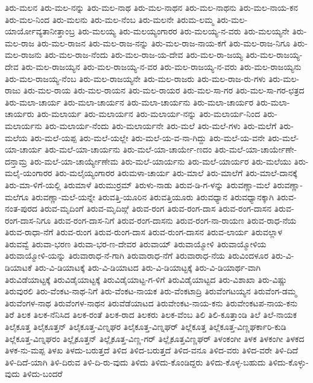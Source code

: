 ತಿರು-ಮಲನ
ತಿರು-ಮಲ-ನನ್ನು
ತಿರು-ಮಲ-ನಾಥ
ತಿರು-ಮಲ-ನಾಥನ
ತಿರು-ಮಲ-ನಾಥನು
ತಿರು-ಮಲ-ನಾಯ-ಕನ
ತಿರು-ಮಲ-ನಿಂದ
ತಿರು-ಮಲನು
ತಿರು-ಮಲ-ನೆಂಬ
ತಿರು-ಮಲನೇ
ತಿರುಮ-ಲಮ್ಮ
ತಿರು-ಮಲ-ಯಾರ್ಯೋವ್ಯತಾನೀತ್ತಾಂಬ್ರ
ತಿರು-ಮಲಯ್ಯ
ತಿರು-ಮಲಯ್ಯಂಗಾರರ
ತಿರು-ಮಲಯ್ಯ-ನ-ವರು
ತಿರು-ಮಲಯ್ಯನೇ
ತಿರು-ಮಲ-ರಾಜ
ತಿರು-ಮಲ-ರಾಜನ
ತಿರು-ಮಲ-ರಾಜ-ನನ್ನು
ತಿರು-ಮಲ-ರಾಜ-ನಾಯ-ಕಗೆ
ತಿರು-ಮಲ-ರಾಜ-ನಿಗೂ
ತಿರು-ಮಲ-ರಾಜನು
ತಿರು-ಮಲ-ರಾಜ-ನೆಂದು
ತಿರು-ಮಲ-ರಾಜ-ಯ-ದೇವ
ತಿರು-ಮಲ-ರಾ-ಜಯ್ಯ
ತಿರು-ಮಲ-ರಾಜಯ್ಯ-ದೇವ
ತಿರು-ಮಲ-ರಾಜಯ್ಯನ
ತಿರು-ಮಲ-ರಾಜಯ್ಯ-ನ-ವರ
ತಿರು-ಮಲ-ರಾಜಯ್ಯ-ನ-ವರು
ತಿರು-ಮಲ-ರಾಜಯ್ಯನು
ತಿರು-ಮಲ-ರಾಜಯ್ಯ-ನೆಂಬ
ತಿರು-ಮಲ-ರಾಜಯ್ಯನೇ
ತಿರು-ಮಲ-ರಾಜರು
ತಿರು-ಮಲ-ರಾಜ-ರು-ಗಳು
ತಿರು-ಮಲ-ರಾಜು
ತಿರು-ಮಲ-ರಾಯ
ತಿರು-ಮಲ-ರಾಯನ
ತಿರು-ಮಲ-ರಾಯರ
ತಿರು-ಮಲ-ಸಾ-ಗರ
ತಿರು-ಮಲ-ಸಾ-ಗರ-ಛತ್ರದ
ತಿರು-ಮಲಾ-ಚಾರ್ಯ
ತಿರು-ಮಲಾ-ಚಾರ್ಯನ
ತಿರು-ಮಲಾ-ಚಾರ್ಯನು
ತಿರು-ಮಲಾ-ಚಾರ್ಯರ
ತಿರು-ಮಲಾ-ಚಾರ್ಯರು
ತಿರು-ಮಲಾರ್ಯ
ತಿರು-ಮಲಾರ್ಯನ
ತಿರು-ಮಲಾರ್ಯ-ನನ್ನು
ತಿರು-ಮಲಾರ್ಯ-ನಿಂದ
ತಿರು-ಮಲಾರ್ಯನು
ತಿರು-ಮಲಾರ್ಯ-ನೆಂದು
ತಿರು-ಮಲಾರ್ಯನೇ
ತಿರು-ಮಲೆ
ತಿರು-ಮಲೆ-ಗಳು
ತಿರು-ಮಲೆಗೆ
ತಿರು-ಮಲೆಯ
ತಿರು-ಮಲೆ-ಯಪ್ಪ
ತಿರು-ಮಲೆ-ಯಲ್ಲೇ
ತಿರು-ಮಲೆ-ಯ-ವ-ನಾ-ಗಿದ್ದು
ತಿರು-ಮಲೆ-ಯ-ವನೇ
ತಿರು-ಮಲೆ-ಯಾ-ಚಾರ್ಯ
ತಿರು-ಮಲೆ-ಯಾ-ಚಾರ್ಯನು
ತಿರು-ಮಲೆ-ಯಾ-ಚಾರ್ಯೇ-ಣದಂ
ತಿರು-ಮಲೆ-ಯಾ-ಚಾರ್ಯೇಣೇ-ದನ್ತಾಮ್ರ
ತಿರು-ಮಲೆ-ಯಾ-ಚಾರ್ಯ್ಯೇಣೇಮ
ತಿರು-ಮಲೆ-ಯಾರ್ಯನು
ತಿರು-ಮಲೆ-ಯಾರ್ಯರ
ತಿರು-ಮಲೆಯು
ತಿರು-ಮಲೈ-ಯಂಗಾರರ
ತಿರು-ಮಲೈಯ್ಯಂಗಾರರ
ತಿರುಮಳಾ-ಚಾರ್ಯ
ತಿರು-ಮಾಲೆ
ತಿರು-ಮಾಲೆಗೆ
ತಿರು-ಮಾಲೆ-ದಾನಕ್ಕೆ
ತಿರು-ಮಾ-ಳಿಗೆ-ಯಲ್ಲಿ
ತಿರುಮಾಳೆ
ತಿರುಮುರ್ರಮ್
ತಿರುಳು-ನಾಡು
ತಿರುವ-ಡಿ-ಗ-ಳನ್ನು
ತಿರುವಣ್ಣಾ-ಮಲೆ
ತಿರುವಣ್ಣಾ-ಮಲೆಗೂ
ತಿರುವಣ್ಣಾ-ಮಲೆ-ಯನ್ನೇ
ತಿರುವತ್ತಿ-ಯೂರಿನ
ತಿರುವತ್ತಿಯೂರು
ತಿರುವಧ್ಯಾನ
ತಿರುವಧ್ಯಾನಕ್ಕಾಗಿ
ತಿರುವ-ನಂತ-ಪುರದ
ತಿರುವ-ಮೃದಿಂಗೆ
ತಿರುವ-ಮೃದಿಙ್ಗೆ
ತಿರುವ-ರಂಗ
ತಿರುವ-ರಂಗ-ದಾಸ
ತಿರುವ-ರಂಗ-ದಾಸನ
ತಿರುವ-ರಂಗ-ದಾಸ-ನಿಗೂ
ತಿರುವ-ರಂಗ-ದಾಸ-ನಿಗೆ
ತಿರುವ-ರಂಗ-ದಾಸನು
ತಿರುವ-ರಂಗ-ನಾ-ರಾಯಣ
ತಿರುವ-ರಾಧ-ನೆಯ
ತಿರುವ-ರಾಧಾ-ನೆಗೆ
ತಿರುವ-ರುಂಗ
ತಿರುವ-ರುಂಗ-ದಾಸ
ತಿರುವ-ರುಂಗ-ದಾಸನ
ತಿರುವ-ಲಾರ್ಯ
ತಿರುವಲ್ಲಾಳ
ತಿರುವವ್ವೆ
ತಿರುವಾ-ಭರಣ
ತಿರುವಾ-ಭರ-ಣ-ದೇವರ
ತಿರುವಾಯ್
ತಿರುವಾಯ್ಮೋಳಿ
ತಿರುವಾಯ್ಮೋಳಿಯ
ತಿರುವಾಯ್ಮೋಳಿ-ಯನ್ನು
ತಿರುವಾರಾಧ-ನೆ-ಗಾಗಿ
ತಿರುವಾರಾಧ-ನೆಗೆ
ತಿರುವಾರಾಧ-ನೆಯ
ತಿರುವಿಂದಳೂರ
ತಿರು-ವಿ-ಡಿಯಾಟಕೆ
ತಿರು-ವಿ-ಡಿಯಾಟಕ್ಕೆ
ತಿರು-ವಿ-ಡಿಯಾಟದ
ತಿರು-ವಿ-ಡಿಯಾಟ್ಟಕ್ಕೆ
ತಿರು-ವಿ-ಡಿಯಾರ್ಥ-ವಾಗಿ
ತಿರುವಿಡೆಯಾಟ್ಟಕ್ಕೆ
ತಿರುವಿಡೈಯಾಟ್ಟಕ್ಕೆ
ತಿರುವಿಡೈಯಾಟ್ಟ-ಗ-ಳಿಗೆ
ತಿರುವಿಡೈಯಾಟ್ಟದ
ತಿರು-ವಿಶಾಖಾ
ತಿರು-ವಿಷ್ಣು
ತಿರುವುರಲಿ
ತಿರು-ವೆಂಕಟ-ನಾಥ-ನಿಗೆ
ತಿರು-ವೆಂಕಟ-ನಾಯಕ
ತಿರು-ವೆಂಕಟಾದ್ರಿ
ತಿರುವೆಂಗಟಯ್ಯನ
ತಿರುವೆಂಗ-ಡಮ್ಮ
ತಿರುವೆಂಗಳ-ನಾಥ
ತಿರುವೆಂಗಳ-ನಾಥನ
ತಿರುವೆಡೆಯಾಟದ
ತಿರುವೇಂಕಟ-ನಾಯ-ಕನು
ತಿರುವೇಂಕಟಪ-ನಾಯ-ಕನು
ತಿರೆ
ತಿಲಕ
ತಿಲಕ-ನೆನಿಸಿದ
ತಿಲಕ-ರಂತೆ
ತಿಲಕ-ರಾದ
ತಿಲಕರು
ತಿಲಕ-ವೆಂಬ
ತಿಲಿ
ತಿಲಿ-ಕೂತ್ತಾಂಡಿ
ತಿಲೆ
ತಿಲೆ-ನಾಯಕ
ತಿಲೈಕೂತ್ತ
ತಿಲೈಕೂತ್ತನ್
ತಿಲೈಕೂತ್ತ-ವಿಣ್ನಘರ
ತಿಲೈಕೂತ್ತ-ವಿಣ್ನಘರ್
ತಿಲ್ಲೆಕೂತ್ತ
ತಿಲ್ಲೆಕೂತ್ತ-ವಿಣ್ಣಘರ್ಕಾರಿ-ಕುಡಿ
ತಿಲ್ಲೆಕೂತ್ತ-ವಿಣ್ನಘರಂ
ತಿಲ್ಲೈಕೂತ್ತನ್
ತಿಲ್ಲೈಕೂತ್ತ-ವಿಣ್ಣ-ಗರ್
ತಿಲ್ಲೈಕೂತ್ತವಿಣ್ಣಘರ್
ತಿಳಂಕಂಗೀ
ತಿಳಕ
ತಿಳಕಂಗೀ
ತಿಳಕದ
ತಿಳಕ-ನು-ಮಪ್ಪ
ತಿಳಖ
ತಿಳದು-ಬರುತ್ತದೆ
ತಿಳಿದ
ತಿಳಿದ-ಬರುತ್ತದೆ
ತಿಳಿದ-ವನೂ
ತಿಳಿದ-ವರು
ತಿಳಿದ-ವರೇ
ತಿಳಿ-ದಿದೆ
ತಿಳಿ-ದಿದೆ-ಯಾಗಿ
ತಿಳಿ-ದಿರುವ
ತಿಳಿ-ದಿ-ರು-ವುದು
ತಿಳಿದು
ತಿಳಿದು-ಕೊಂಡಿದ್ದರು
ತಿಳಿದು-ಕೊಳ್ಳ-ಬಹುದು
ತಿಳಿದು-ಕೊಳ್ಳು-ವುದು
ತಿಳಿದು-ಬಂದರೆ
